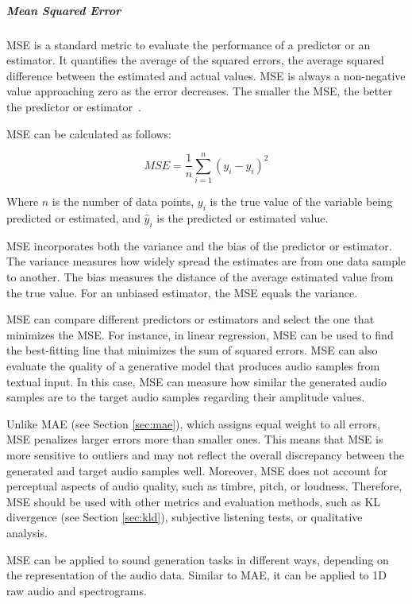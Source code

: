\subparagraph{Mean Squared Error} \label{sec:mse}

\Acf{MSE} is a standard metric to evaluate the performance of a predictor or an estimator. It quantifies the average of the squared errors, the average squared difference between the estimated and actual values. \Ac{MSE} is always a non-negative value approaching zero as the error decreases. The smaller the \ac{MSE}, the better the predictor or estimator~\cite{hodson_mean_2021}.

\Ac{MSE} can be calculated as follows:

$$
MSE = \frac{1}{n} \sum_{i=1}^n (y_i - \hat{y}_i)^2
$$

Where $n$ is the number of data points, $y_i$ is the true value of the variable being predicted or estimated, and $\hat{y}_i$ is the predicted or estimated value.

\Ac{MSE} incorporates both the variance and the bias of the predictor or estimator. The variance measures how widely spread the estimates are from one data sample to another. The bias measures the distance of the average estimated value from the true value. For an unbiased estimator, the \ac{MSE} equals the variance.

\Ac{MSE} can compare different predictors or estimators and select the one that minimizes the \ac{MSE}. For instance, in linear regression, \ac{MSE} can be used to find the best-fitting line that minimizes the sum of squared errors. \Ac{MSE} can also evaluate the quality of a generative model that produces audio samples from textual input. In this case, \ac{MSE} can measure how similar the generated audio samples are to the target audio samples regarding their amplitude values.

Unlike \ac{MAE} (see Section \ref{sec:mae}), which assigns equal weight to all errors, \ac{MSE} penalizes larger errors more than smaller ones. This means that \ac{MSE} is more sensitive to outliers and may not reflect the overall discrepancy between the generated and target audio samples well. Moreover, \ac{MSE} does not account for perceptual aspects of audio quality, such as timbre, pitch, or loudness. Therefore, \ac{MSE} should be used with other metrics and evaluation methods, such as \ac{KL} divergence (see Section \ref{sec:kld}), subjective listening tests, or qualitative analysis.

\Ac{MSE} can be applied to sound generation tasks in different ways, depending on the representation of the audio data. Similar to \ac{MAE}, it can be applied to 1D raw audio and spectrograms.

